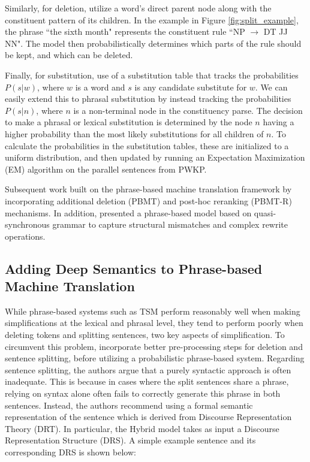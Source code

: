 \documentclass[thesis.tex]{subfiles}
\begin{document}
Similarly, for deletion, \cite{zhu2010monolingual} utilize a word's direct parent node along with the constituent pattern of its children. In the example in Figure \ref{fig:split_example}, the phrase ``the sixth month" represents the constituent rule ``NP $\rightarrow$ DT JJ NN". The model then probabilistically determines which parts of the rule should be kept, and which can be deleted.

Finally, for substitution, \cite{zhu2010monolingual} use of a substitution table that tracks the probabilities $P(s|w)$, where $w$ is a word and $s$ is any candidate substitute for $w$. We can easily extend this to phrasal substitution by instead tracking the probabilities $P(s|n)$, where $n$ is a non-terminal node in the constituency parse. The decision to make a phrasal or lexical substitution is determined by the node $n$ having a higher probability than the most likely substitutions for all children of $n$. To calculate the probabilities in the substitution tables, these are initialized to a uniform distribution, and then updated by running an Expectation Maximization (EM) algorithm on the parallel sentences from PWKP.

Subsequent work built on the phrase-based machine translation framework by incorporating additional deletion (PBMT) \citep{coster2011learning} and post-hoc reranking (PBMT-R) \citep{wubben2012sentence} mechanisms. In addition, \cite{woodsend2011learning} presented a phrase-based model based on quasi-synchronous grammar to capture structural mismatches and complex rewrite operations.

\subsection{Adding Deep Semantics to Phrase-based Machine Translation}

While phrase-based systems such as TSM \citep{zhu2010monolingual} perform reasonably well when making simplifications at the lexical and phrasal level, they tend to perform poorly when deleting tokens and splitting sentences, two key aspects of simplification. To circumvent this problem, \cite{narayan2014hybrid} incorporate better pre-processing steps for deletion and sentence splitting, before utilizing a probabilistic phrase-based system. Regarding sentence splitting, the authors argue that a purely syntactic approach \citep{zhu2010monolingual} is often inadequate. This is because in cases where the split sentences share a phrase, relying on syntax alone often fails to correctly generate this phrase in both sentences. Instead, the authors recommend using a formal semantic representation of the sentence which is derived from Discourse Representation Theory (DRT). In particular, the Hybrid model takes as input a Discourse Representation Structure (DRS). A simple example sentence and its corresponding DRS is shown below:
\end{document}
